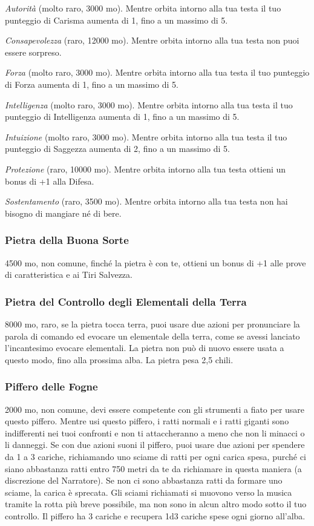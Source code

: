 \begin{multicols}{2}
\textit{Autorità} (molto raro, 3000 mo). Mentre orbita intorno alla tua testa il tuo punteggio di Carisma aumenta di 1, fino a un massimo di 5.

\textit{Consapevolezza} (raro, 12000 mo). Mentre orbita intorno alla tua testa non puoi essere sorpreso.

\textit{Forza} (molto raro, 3000 mo). Mentre orbita intorno alla tua testa il tuo punteggio di Forza aumenta di 1, fino a un massimo di 5.

\textit{Intelligenza} (molto raro, 3000 mo). Mentre orbita intorno alla tua testa il tuo punteggio di Intelligenza aumenta di 1, fino a un massimo di 5.

\textit{Intuizione} (molto raro, 3000 mo). Mentre orbita intorno alla tua testa il tuo punteggio di Saggezza aumenta di 2, fino a un massimo di 5.

\textit{Protezione} (raro, 10000 mo). Mentre orbita intorno alla tua testa ottieni un bonus di +1 alla Difesa.

\textit{Sostentamento} (raro, 3500 mo). Mentre orbita intorno alla tua testa non hai bisogno di mangiare né di bere.

\subsubsection*{Pietra della Buona Sorte}
4500 mo, non comune, finché la pietra è con te, ottieni un bonus di +1 alle prove di caratteristica e ai Tiri Salvezza.

\subsubsection*{Pietra del Controllo degli Elementali della Terra}
8000 mo, raro, se la pietra tocca terra, puoi usare due azioni per pronunciare la parola di comando ed evocare un elementale della terra, come se avessi lanciato l'incantesimo evocare elementali. La pietra non può di nuovo essere usata a questo modo, fino alla prossima alba. La pietra pesa 2,5 chili.

\subsubsection*{Piffero delle Fogne}
2000 mo, non comune, devi essere competente con gli strumenti a fiato per usare questo piffero. Mentre usi questo piffero, i ratti normali e i ratti giganti sono indifferenti nei tuoi confronti e non ti attaccheranno a meno che non li minacci o li danneggi. Se con due azioni suoni il piffero, puoi usare due azioni per spendere da 1 a 3 cariche, richiamando uno sciame di ratti per ogni carica spesa, purché ci siano abbastanza ratti entro 750 metri da te da richiamare in questa maniera (a discrezione del Narratore). Se non ci sono abbastanza ratti da formare uno sciame, la carica è sprecata. Gli sciami richiamati si muovono verso la musica tramite la rotta più breve possibile, ma non sono in alcun altro modo sotto il tuo controllo. Il piffero ha 3 cariche e recupera 1d3 cariche spese ogni giorno all'alba.


\end{multicols}
